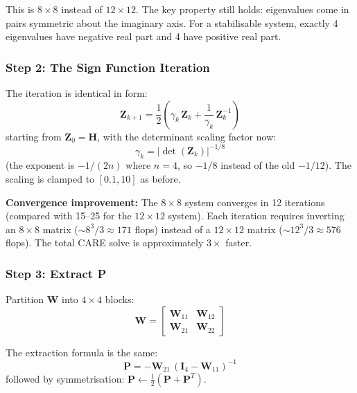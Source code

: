 \documentclass[12pt, a4paper]{article}
\newcommand{\bP}{\bm{P}}
\newcommand{\bI}{\bm{I}}
\begin{document}
This is $8 \times 8$ instead of $12 \times 12$.  The key property still holds: eigenvalues come in pairs symmetric about the imaginary axis.  For a stabilisable system, exactly 4 eigenvalues have negative real part and 4 have positive real part.

\subsubsection{Step 2: The Sign Function Iteration}

The iteration is identical in form:
\begin{equation}
    \bm{Z}_{k+1} = \frac{1}{2} \left( \gamma_k \, \bm{Z}_k + \frac{1}{\gamma_k} \, \bm{Z}_k^{-1} \right)
    \label{eq:sign_iter}
\end{equation}
starting from $\bm{Z}_0 = \bm{H}$, with the determinant scaling factor now:
\begin{equation}
    \gamma_k = |\det(\bm{Z}_k)|^{-1/8}
\end{equation}
(the exponent is $-1/(2n)$ where $n = 4$, so $-1/8$ instead of the old $-1/12$).  The scaling is clamped to $[0.1, 10]$ as before.

\textbf{Convergence improvement:} The $8 \times 8$ system converges in 12 iterations (compared with 15--25 for the $12 \times 12$ system).  Each iteration requires inverting an $8 \times 8$ matrix ($\sim 8^3/3 \approx 171$ flops) instead of a $12 \times 12$ matrix ($\sim 12^3/3 \approx 576$ flops).  The total CARE solve is approximately $3\times$ faster.

\subsubsection{Step 3: Extract P}

Partition $\bm{W}$ into $4\times4$ blocks:
\begin{equation}
    \bm{W} = \begin{bmatrix} \bm{W}_{11} & \bm{W}_{12} \\ \bm{W}_{21} & \bm{W}_{22} \end{bmatrix}
\end{equation}

The extraction formula is the same:
\begin{equation}
    \bP = -\bm{W}_{21} \, (\bI_4 - \bm{W}_{11})^{-1}
    \label{eq:P_extraction}
\end{equation}
followed by symmetrisation: $\bP \leftarrow \frac{1}{2}(\bP + \bP^T)$.
\end{document}
